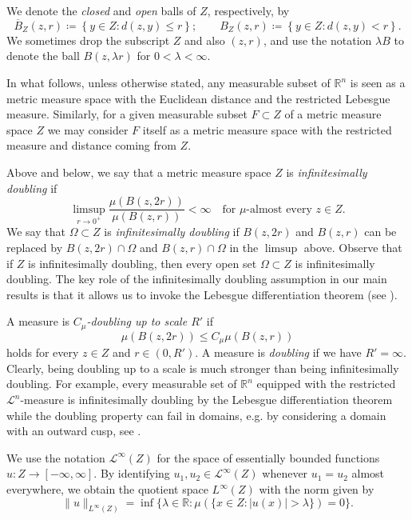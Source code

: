 \documentclass[reqno]{amsart}
\numberwithin{equation}{section}
\theoremstyle{remark}
\newcommand{\R}{\mathbb{R}}
\def\fz{\infty}
\begin{document}
We denote the \emph{closed} and \emph{open} balls of $Z$, respectively, by $$\overline{B}_Z(z,r) \coloneqq \left\{ y \in Z \colon d(z,y) \leq r \right\};\quad \quad B_Z(z,r) \coloneqq \left\{ y \in Z \colon d(z,y) < r \right\}.$$ We sometimes drop the subscript $Z$ and also $(z,r)$, and use the notation $\lambda B$ to denote the ball $B( z, \lambda r )$  for $0<\lambda<\fz$.

In what follows, unless otherwise stated, any measurable subset of $\R^n$ is seen as a metric measure space with the Euclidean distance and the restricted Lebesgue measure. Similarly, for a given measurable subset $F\subset Z$ of a metric measure space $Z$ we may consider $F$ itself as a metric measure space with the restricted measure and distance coming from $Z$.

Above and below, we say that a metric measure space $Z$ is \emph{infinitesimally doubling} if
\begin{equation*}
    \limsup_{ r \rightarrow 0^{+} } \frac{ \mu( B(z,2r) ) }{ \mu( B(z,r) ) } < \infty
    \quad\text{for $\mu$-almost every $z \in Z$}.
\end{equation*}
We say that $\Omega \subset Z$ is \emph{infinitesimally doubling} if $B(z,2r)$ and $B(z,r)$ can be replaced by $B(z,2r) \cap \Omega$ and $B(z,r) \cap \Omega$ in the $\limsup$ above. Observe that if $Z$ is infinitesimally doubling, then every open set $\Omega \subset Z$ is infinitesimally doubling.  The key role of the infinitesimally doubling assumption in our main results is that it allows us to invoke the Lebesgue differentiation theorem (see \cite[Section 3.4]{HKST2015}).

A measure is \emph{$C_\mu$-doubling up to scale $R'$} if 
$$\mu( B(z,2r) ) \leq C_\mu \mu(B(z,r))$$ 
holds for every $z \in Z$ and $r \in (0,R')$. A measure is \emph{doubling} if we have $R' = \infty$. Clearly, being doubling up to a scale is much stronger than being infinitesimally doubling. For example, every measurable set of $\R^n$ equipped with the restricted $\mathcal L^n$-measure is infinitesimally doubling by the Lebesgue differentiation theorem while the doubling property can fail in domains, e.g. by considering a domain with an outward cusp, see .


We use the notation $\mathcal L^{\infty}(Z)$ for the space of essentially bounded functions $u\colon Z\to [-\infty,\infty]$. By identifying $u_1,u_2\in\mathcal L^{\infty}(Z)$ whenever $u_1=u_2$ almost everywhere, we obtain the quotient space $L^{\infty}(Z)$ with the norm given by $$\|u\|_{L^{\infty}(Z)}=\inf \{ \lambda\in\R\colon \mu\left( \{x\in Z\colon |u(x)|>\lambda\} \right) =0  \} .$$ 
\end{document}
